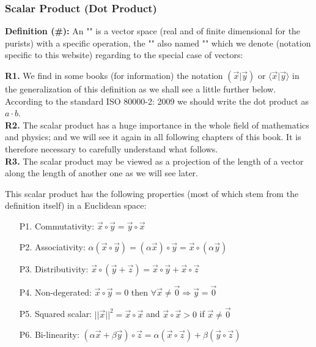 	\pagebreak	
	\subsubsection{Scalar Product (Dot Product)}\label{dot product}
	\textbf{Definition (\#\mydef):} An "" is a vector space (real and of finite dimensional for the purists) with a specific operation, the "" also named "" which we denote (notation specific to this website) regarding to the special case of vectors:
	
	\begin{tcolorbox}[title=Remarks,colframe=black,arc=10pt]
	\textbf{R1.} We find in some books (for information) the notation $\left( \vec{x}|\vec{y}\right)$ or $\langle \vec{x} | \vec{y} \rangle$ in the generalization of this definition as we shall see a little further below. According to the standard ISO 80000-2: 2009 we should write the dot product as $a\cdot b$.\\
	
	\textbf{R2.} The scalar product has a huge importance in the whole field of mathematics and physics; and we will see it again in all following chapters of this book. It is therefore necessary to carefully understand what follows.\\
	
	\textbf{R3.} The scalar product may be viewed as a projection of the length of a vector along the length of another one as we will see later.
	\end{tcolorbox}	
	This scalar product has the following properties (most of which stem from the definition itself) in a Euclidean space:
	\begin{enumerate}
		\item[P1.] Commutativity: $\vec{x}\circ\vec{y}=\vec{y}\circ\vec{x}$
		\item[P2.] Associativity: $\alpha(\vec{x}\circ\vec{y})=(\alpha\vec{x})\circ\vec{y}=\vec{x}\circ(\alpha\vec{y}) $
		\item[P3.] Distributivity: $\vec{x}\circ(\vec{y}+\vec{z})=\vec{x}\circ\vec{y}+\vec{x}\circ\vec{z}$
		\item[P4.] Non-degerated: $\vec{x}\circ\vec{y}=0$ then $\forall\vec{x}\neq\vec{0}\Rightarrow \vec{y}=\vec{0}$
		\item[P5.] Squared scalar: $||\vec{x}||^2=\vec{x}\circ\vec{x}$ and $\vec{x}\circ\vec{x}>0$ if $\vec{x}\neq \vec{0}$
		\item[P6.] Bi-linearity: $(\alpha\vec{x}+\beta\vec{y})\circ\vec{z}=\alpha(\vec{x}\circ	\vec{z})+\beta(\vec{y}\circ\vec{z})$
	\end{enumerate}

